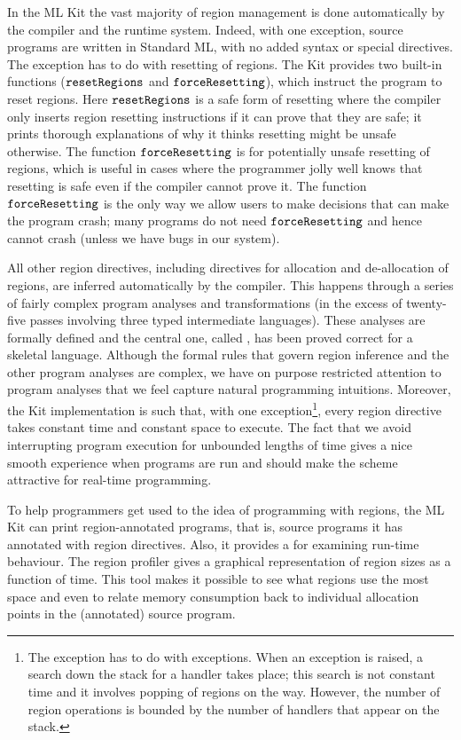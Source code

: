 \documentclass[12pt]{book}
\begin{document}
In the ML Kit the vast majority of region management is done
automatically by the compiler and the runtime system.  Indeed, with
one exception, source programs are written in Standard ML, with no
added syntax or special directives. The exception has to do with
resetting of regions. The Kit provides two built-in functions
($\hbox{\tt resetRegions}$ and $\hbox{\tt forceResetting}$), which instruct the
program to reset regions. Here $\hbox{\tt resetRegions}$ is a safe form of resetting
where the compiler only inserts region resetting instructions if it can prove
that they are safe; it prints thorough explanations of why it thinks
resetting might be unsafe otherwise. The function $\hbox{\tt forceResetting}$ is for potentially
unsafe resetting of regions, which is useful in cases where the
programmer jolly well knows that resetting is safe even if the
compiler cannot prove it. The function $\hbox{\tt forceResetting}$ is the only way we allow users to
make decisions that can make the program crash; many programs do not
need $\hbox{\tt forceResetting}$ and hence cannot crash (unless we have bugs in our
system).

All other region directives, including directives for
allocation and de-allocation of regions, are inferred automatically by
the compiler.  This happens through a series of fairly complex program
analyses and transformations (in the excess of twenty-five passes
involving three typed intermediate languages). These analyses are formally
defined and the central one, called , has been
proved correct for a skeletal language. Although the formal rules
that govern region inference and the other program analyses are
complex, we have on purpose restricted attention to program analyses
that we feel capture natural programming intuitions.
Moreover, the Kit implementation is such that, with one exception\footnote{The exception
has to do with exceptions. When an exception is raised, a search
down the stack for a handler takes place; this search is not
constant time and it involves popping of regions on the way. However,
the number of region operations is bounded by the number of
handlers that appear on the stack.},
every region directive takes constant time and constant space to execute. The
fact that we avoid interrupting program execution for unbounded lengths
of time gives a nice smooth experience when programs are run and should
make the scheme attractive for real-time programming.

To help programmers get used to the idea of programming with regions,
the ML Kit can print region-annotated programs, that is, source programs
it has annotated with region directives. Also, it provides a  for examining run-time
behaviour.  The region profiler gives a graphical representation of
region sizes as a function of time. This tool makes it possible to see
what regions use the most space and even to relate memory consumption
back to individual allocation points in the (annotated) source
program.
\end{document}
